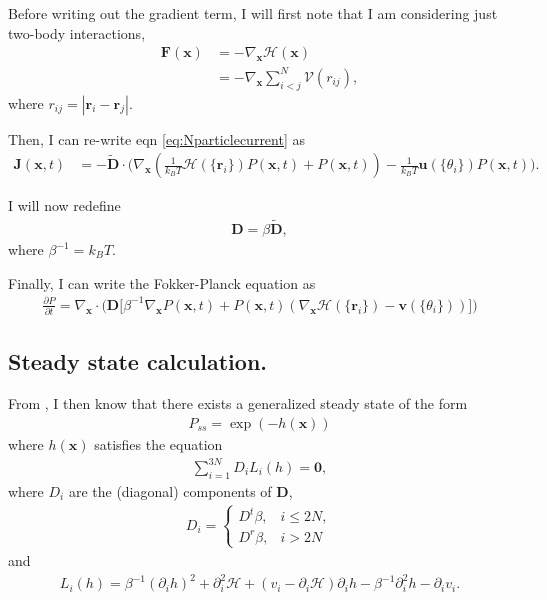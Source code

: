 \documentclass{article}
\begin{document}
Before writing out the gradient term, I will first note that I am considering just two-body
interactions,
\begin{align}\label{eq:general_conservative_force}
  \bm{F}(\bm{x})&=-\nabla_{\bm{x}}\mathcal{H}(\bm{x})\nonumber\\
                &=-\nabla_{\bm{x}}\sum_{i<j}^N\mathcal{V}(r_{ij}),
\end{align}
where $r_{ij}=|\bm{r}_i-\bm{r}_j|$.

Then, I can re-write eqn \ref{eq:Nparticlecurrent} as
\begin{align}\label{eq:Nparticlewithpotential}
  \bm{J}(\bm{x},t)&=-\bm{\tilde{D}}
                    \cdot\big(\nabla_{\bm{x}}(\frac{1}{k_BT}\mathcal{H}(\{\bm{r}_i\})
                    P(\bm{x},t)
                    +P(\bm{x},t))
                    -\frac{1}{k_BT}\bm{u}(\{\theta_i\})P(\bm{x},t)\big).
\end{align}

I will now redefine
\begin{align}
  \bm{D}=\beta\bm{\tilde{D}},
\end{align}
where $\beta^{-1}=k_BT$.


Finally, I can write the Fokker-Planck equation as
\begin{align}
  \frac{\partial P}{\partial t}=\nabla_{\bm{x}}\cdot\big(\bm{D}
  \big[\beta^{-1}\nabla_{\bm{x}}P(\bm{x},t)+P(\bm{x},t)(\nabla_{\bm{x}}
  \mathcal{H}(\{\bm{r}_i\})-\bm{v}(\{\theta_i\}))\big]\big)
\end{align}

\subsection{Steady state calculation.}

From \cite{liverpool2018nonequilibrium}, I then know that there exists a generalized steady
state of the form
\begin{align}
  P_{ss}=\exp(-h(\bm{x}))
\end{align}
where $h(\bm{x})$ satisfies the equation
\begin{align}\label{eq:ss_condition}
  \sum_{i=1}^{3N}D_iL_i(h)=\bm{0},
\end{align}
where $D_i$ are the (diagonal) components of $\bm{D}$,
\begin{align}
  D_i =
  \begin{cases}
    D^t\beta,&i\leq 2N,\\
    D^r\beta,&i>2N
  \end{cases}
\end{align}
and
\begin{align}\label{eq:L_i}
  L_i(h) = \beta^{-1}(\partial_ih)^2+\partial_i^2\mathcal{H}
  +(v_i-\partial_i\mathcal{H})\partial_ih-\beta^{-1}\partial_i^2h-\partial_iv_i.
\end{align}
\end{document}
